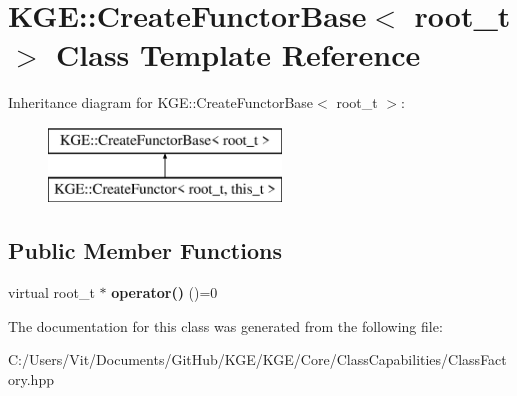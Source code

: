 \hypertarget{class_k_g_e_1_1_create_functor_base}{\section{K\-G\-E\-:\-:Create\-Functor\-Base$<$ root\-\_\-t $>$ Class Template Reference}
\label{class_k_g_e_1_1_create_functor_base}
}
Inheritance diagram for K\-G\-E\-:\-:Create\-Functor\-Base$<$ root\-\_\-t $>$\-:\begin{figure}[H]
\begin{center}
\leavevmode
\includegraphics[height=2.000000cm]{class_k_g_e_1_1_create_functor_base}
\end{center}
\end{figure}
\subsection*{Public Member Functions}
\begin{DoxyCompactItemize}
\item 
\hypertarget{class_k_g_e_1_1_create_functor_base_adb47c3c6c9ce98e61ed3906f6f14cce0}{virtual root\-\_\-t $\ast$ {\bfseries operator()} ()=0}\label{class_k_g_e_1_1_create_functor_base_adb47c3c6c9ce98e61ed3906f6f14cce0}

\end{DoxyCompactItemize}


The documentation for this class was generated from the following file\-:\begin{DoxyCompactItemize}
\item 
C\-:/\-Users/\-Vit/\-Documents/\-Git\-Hub/\-K\-G\-E/\-K\-G\-E/\-Core/\-Class\-Capabilities/Class\-Factory.\-hpp\end{DoxyCompactItemize}
